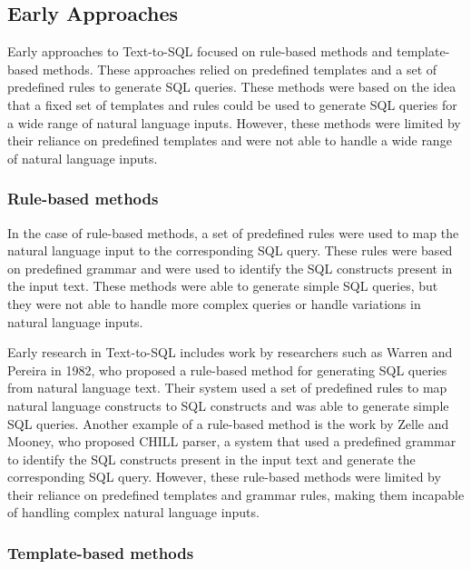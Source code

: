\subsection{Early Approaches}

Early approaches to Text-to-SQL focused on rule-based methods and template-based methods. These approaches relied on predefined templates and a set of predefined rules to generate SQL queries. These methods were based on the idea that a fixed set of templates and rules could be used to generate SQL queries for a wide range of natural language inputs. However, these methods were limited by their reliance on predefined templates and were not able to handle a wide range of natural language inputs.

\subsubsection{Rule-based methods}

In the case of rule-based methods, a set of predefined rules were used to map the natural language input to the corresponding SQL query. These rules were based on predefined grammar and were used to identify the SQL constructs present in the input text. These methods were able to generate simple SQL queries, but they were not able to handle more complex queries or handle variations in natural language inputs.

Early research in Text-to-SQL includes work by researchers such as Warren and Pereira in 1982\cite{Warren1982AnEE}, who proposed a rule-based method for generating SQL queries from natural language text. Their system used a set of predefined rules to map natural language constructs to SQL constructs and was able to generate simple SQL queries. Another example of a rule-based method is the work by Zelle and Mooney, who proposed CHILL parser\cite{Zelle1996LearningTP}, a system that used a predefined grammar to identify the SQL constructs present in the input text and generate the corresponding SQL query. However, these rule-based methods were limited by their reliance on predefined templates and grammar rules, making them incapable of handling complex natural language inputs.

\subsubsection{Template-based methods}


